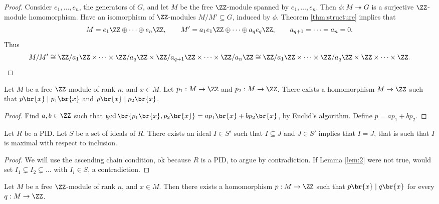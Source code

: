 \begin{proof}
Consider $ e_1, \dots, e_n $, the generators of $ G $, and let $ M $ be the free $ \ZZ $-module spanned by $ e_1, \dots, e_n $. Then $ \phi : M \twoheadrightarrow G $ is a surjective $ \ZZ $-module homomorphism. Have an isomorphism of $ \ZZ $-modules $ M / M' \subseteq G $, induced by $ \phi $. Theorem \ref{thm:structure} implies that
$$ M = e_1\ZZ \oplus \dots \oplus e_n\ZZ, \qquad M' = a_1e_1\ZZ \oplus \dots \oplus a_qe_q\ZZ, \qquad a_{q + 1} = \dots = a_n = 0. $$
Thus
$$ M / M' \cong \ZZ / a_1\ZZ \times \dots \times \ZZ / a_q\ZZ \times \ZZ / a_{q + 1}\ZZ \times \dots \times \ZZ / a_n\ZZ \cong \ZZ / a_1\ZZ \times \dots \times \ZZ / a_q\ZZ \times \ZZ \times \dots \times \ZZ. $$
\end{proof}

\begin{lemma}
\label{lem:1}
Let $ M $ be a free $ \ZZ $-module of rank $ n $, and $ x \in M $. Let $ p_1 : M \to \ZZ $ and $ p_2 : M \to \ZZ $. There exists a homomorphism $ M \to \ZZ $ such that $ p\br{x} \mid p_1\br{x} $ and $ p\br{x} \mid p_2\br{x} $.
\end{lemma}

\begin{proof}
Find $ a, b \in \ZZ $ such that $ \gcd\br{p_1\br{x}, p_2\br{x}} = ap_1\br{x} + bp_2\br{x} $, by Euclid's algorithm. Define $ p = ap_1 + bp_2 $.
\end{proof}

\begin{lemma}
\label{lem:2}
Let $ R $ be a PID. Let $ S $ be a set of ideals of $ R $. There exists an ideal $ I \in S' $ such that $ I \subseteq J $ and $ J \in S' $ implies that $ I = J $, that is such that $ I $ is maximal with respect to inclusion.
\end{lemma}

\begin{proof}
We will use the ascending chain condition, ok because $ R $ is a PID, to argue by contradiction. If Lemma \ref{lem:2} were not true, would set $ I_1 \subsetneq I_2 \subsetneq \dots $ with $ I_i \in S $, a contradiction.
\end{proof}

\begin{lemma}
\label{lem:3}
Let $ M $ be a free $ \ZZ $-module of rank $ n $, and $ x \in M $. Then there exists a homomorphism $ p : M \to \ZZ $ such that $ p\br{x} \mid q\br{x} $ for every $ q : M \to \ZZ $.
\end{lemma}

